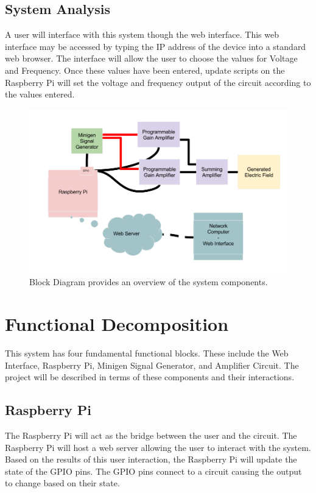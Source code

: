 \documentclass{article}	%
\begin{document}
\begin{multicols}{2}
\subsection{System Analysis}
A user will interface with this system though the web interface.
This web interface may be accessed by
typing the IP address of the device into a standard web browser.
The interface will allow the user to choose the values for Voltage and Frequency.
Once these values have been entered,
update scripts on the Raspberry Pi
will set the voltage and frequency output of the circuit
according to the values entered.

\begin{figure}[!hbt]
\begin{center}
\includegraphics[width=1.0\textwidth,keepaspectratio]{block_diagram.png}
\end{center}
\caption{Block Diagram provides an overview of the system components.}
\end{figure}

\section{Functional Decomposition}
This system has four fundamental functional blocks.
These include the 
Web Interface, 
Raspberry Pi, 
Minigen Signal Generator, and
Amplifier Circuit.
The project will be described in terms of 
these components and
their interactions.

\subsection{Raspberry Pi}
The Raspberry Pi will act as the bridge between the user and the circuit.
The Raspberry Pi will host a web server allowing the user to interact with the system.
Based on the results of this user interaction, 
the Raspberry Pi will update the state of the GPIO pins.
The GPIO pins connect to a circuit causing the output to change based on their state. 


\end{multicols}
\end{document}

